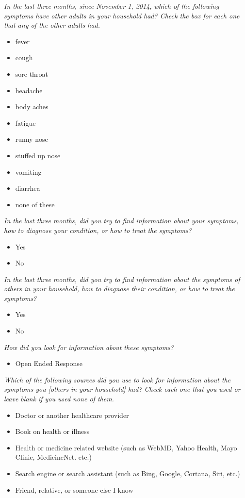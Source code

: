 \documentclass[12pt]{article}
\begin{document}
\emph{In the last three months, since November 1, 2014, which of the following symptoms have other adults in your household had? Check the box for each one that any of the other adults had.}
\begin{itemize}
\item fever
\item cough
\item sore throat
\item headache
\item body aches
\item fatigue
\item runny nose
\item stuffed up nose
\item vomiting
\item diarrhea
\item none of these
\end{itemize}

\emph{In the last three months, did you try to find information about your symptoms, how to diagnose your condition, or how to treat the symptoms?}
\begin{itemize}
\item Yes
\item No
\end{itemize}

\emph{In the last three months, did you try to find information about the symptoms of others in your household, how to diagnose their condition, or how to treat the symptoms?}
\begin{itemize}
\item Yes
\item No
\end{itemize}

\emph{How did you look for information about these symptoms?}
\begin{itemize}
\item Open Ended Response
\end{itemize}

\emph{Which of the following sources did you use to look for information about the symptoms you [others in your household] had? Check each one that you used or leave blank if you used none of them.}
\begin{itemize}
\item Doctor or another healthcare provider
\item Book on health or illness
\item Health or medicine related website (such as WebMD, Yahoo Health, Mayo Clinic, MedicineNet. etc.)
\item Search engine or search assistant (such as Bing, Google, Cortana, Siri, etc.)
\item Friend, relative, or someone else I know
\end{itemize}
\end{document}
